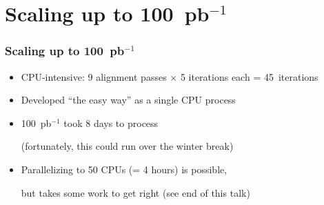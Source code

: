 \documentclass[compress]{beamer}
\begin{document}
\section*{Scaling up to 100~pb$^{-1}$}

\begin{frame}
\frametitle{Scaling up to 100~pb$^{-1}$}
\begin{itemize}\setlength{\itemsep}{0.6 cm}
\item CPU-intensive: 9 alignment passes $\times$ 5 iterations each = 45~iterations

\item Developed ``the easy way'' as a single CPU process

\item 100~pb$^{-1}$ took 8 days to process

\vspace{0.1 cm}
(fortunately, this could run over the winter break)

\item Parallelizing to 50 CPUs (= 4 hours) is possible,

\vspace{0.1 cm}
but takes some work to get right (see end of this talk)
\end{itemize}
\end{frame}
\end{document}
